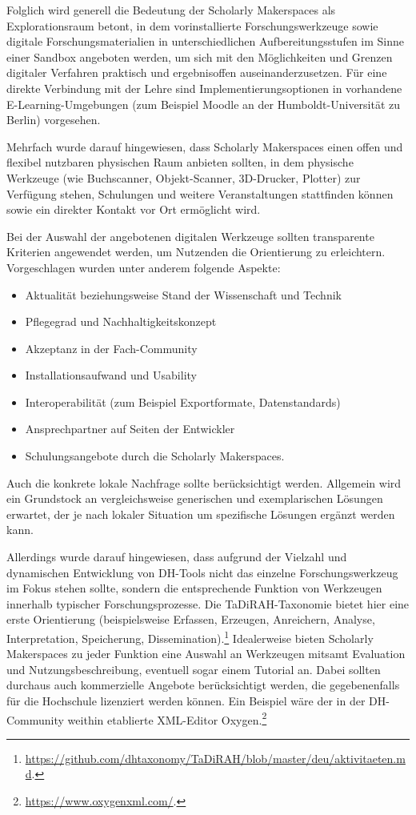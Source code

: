 \documentclass[a4paper,
fontsize=11pt,
oneside,
numbers=noperiodatend,
parskip=half-,
bibliography=totoc,
final
]{scrartcl}
\begin{document}
Folglich wird generell die Bedeutung der Scholarly Makerspaces als
Explorationsraum betont, in dem vorinstallierte Forschungswerkzeuge
sowie digitale Forschungsmaterialien in unterschiedlichen
Aufbereitungsstufen im Sinne einer Sandbox angeboten werden, um sich mit
den Möglichkeiten und Grenzen digitaler Verfahren praktisch und
ergebnisoffen auseinanderzusetzen. Für eine direkte Verbindung mit der
Lehre sind Implementierungsoptionen in vorhandene E-Learning-Umgebungen
(zum Beispiel Moodle an der Humboldt-Universität zu Berlin) vorgesehen.

Mehrfach wurde darauf hingewiesen, dass Scholarly Makerspaces einen
offen und flexibel nutzbaren physischen Raum anbieten sollten, in dem
physische Werkzeuge (wie Buchscanner, Objekt-Scanner, 3D-Drucker,
Plotter) zur Verfügung stehen, Schulungen und weitere Veranstaltungen
stattfinden können sowie ein direkter Kontakt vor Ort ermöglicht wird.

Bei der Auswahl der angebotenen digitalen Werkzeuge sollten transparente
Kriterien angewendet werden, um Nutzenden die Orientierung zu
erleichtern. Vorgeschlagen wurden unter anderem folgende Aspekte:

\begin{itemize}

\item
  Aktualität beziehungsweise Stand der Wissenschaft und Technik
\item
  Pflegegrad und Nachhaltigkeitskonzept
\item
  Akzeptanz in der Fach-Community
\item
  Installationsaufwand und Usability
\item
  Interoperabilität (zum Beispiel Exportformate, Datenstandards)
\item
  Ansprechpartner auf Seiten der Entwickler
\item
  Schulungsangebote durch die Scholarly Makerspaces.
\end{itemize}

Auch die konkrete lokale Nachfrage sollte berücksichtigt werden.
Allgemein wird ein Grundstock an vergleichsweise generischen und
exemplarischen Lösungen erwartet, der je nach lokaler Situation um
spezifische Lösungen ergänzt werden kann.

Allerdings wurde darauf hingewiesen, dass aufgrund der Vielzahl und
dynamischen Entwicklung von DH-Tools nicht das einzelne
Forschungswerkzeug im Fokus stehen sollte, sondern die entsprechende
Funktion von Werkzeugen innerhalb typischer Forschungsprozesse. Die
TaDi\-RAH-Taxonomie bietet hier eine erste Orientierung (beispielsweise
Erfassen, Erzeugen, Anreichern, Analyse, Interpretation, Speicherung,
Dissemination).\footnote{\url{https://github.com/dhtaxonomy/TaDiRAH/blob/master/deu/aktivitaeten.md}.}
Idealerweise bieten Scholarly Makerspaces zu jeder Funktion eine Auswahl
an Werkzeugen mitsamt Evaluation und Nutzungsbeschreibung, eventuell
sogar einem Tutorial an. Dabei sollten durchaus auch kommerzielle
Angebote berücksichtigt werden, die gegebenenfalls für die Hochschule
lizenziert werden können. Ein Beispiel wäre der in der DH-Community
weithin etablierte XML-Editor Oxygen.\footnote{\url{https://www.oxygenxml.com/}.}
\end{document}
